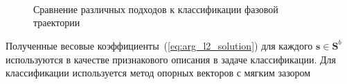 \documentclass[article,14pt,subf,href,colorlinks=true
]{disser}
\begin{document}
\begin{figure}[H]
\centering
\captionsetup{justification=centering,margin=2cm}
\\
\\
\\
\caption{Сравнение различных подходов к классификации фазовой траектории}
\label{fg:alternative_piplines}
\end{figure}

Полученные весовые коэффициенты~(\ref{eq:arg_l2_solution}) для каждого $\mathbf{s} \in \mathbf{S}^{b}$ используются в качестве признакового описания в задаче классификации. Для классификации используется метод опорных векторов с мягким зазором
 
\end{document}
